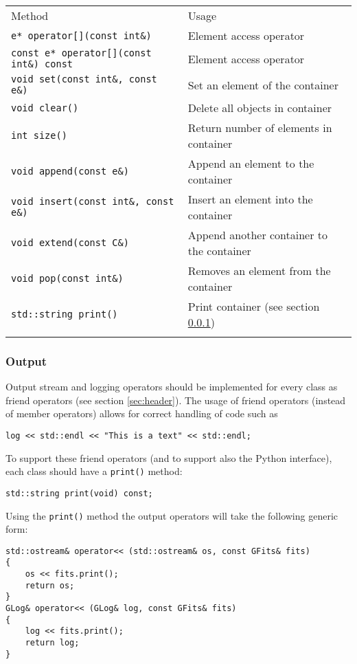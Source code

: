 \documentclass{article}[12pt,a4]
\begin{document}
\begin{center}
\begin{tabular}{ll}
\hline
\hline
\noalign{\smallskip}
Method & Usage \\
\noalign{\smallskip}
\hline
\noalign{\smallskip}
{\tt e* operator[](const int\&)} & Element access operator \\
{\tt const e* operator[](const int\&) const} & Element access operator \\
{\tt void set(const int\&, const e\&)} & Set an element of the container \\
{\tt void clear()} & Delete all objects in container \\
{\tt int size()} & Return number of elements in container \\
{\tt void append(const e\&)} & Append an element to the container \\
{\tt void insert(const int\&, const e\&)} & Insert an element into the container \\
{\tt void extend(const C\&)} & Append another container to the container \\
{\tt void pop(const int\&)} & Removes an element from the container \\
{\tt std::string print()} & Print container (see section \ref{sec:output}) \\
\noalign{\smallskip}
\hline
\end{tabular}
\end{center}


\subsubsection{Output}
\label{sec:output}

Output stream and logging operators should be implemented for every class as friend
operators (see section \ref{sec:header}).
The usage of friend operators (instead of member operators) allows for correct handling
of code such as
\begin{verbatim}
log << std::endl << "This is a text" << std::endl;
\end{verbatim}
To support these friend operators (and to support also the Python interface), each class
should have a {\tt print()} method:
\begin{verbatim}
std::string print(void) const;
\end{verbatim}
Using the {\tt print()} method the output operators will take the following generic form:
\begin{verbatim}
std::ostream& operator<< (std::ostream& os, const GFits& fits)
{
    os << fits.print();
    return os;
}
GLog& operator<< (GLog& log, const GFits& fits)
{
    log << fits.print();
    return log;
}
\end{verbatim}
\end{document}
